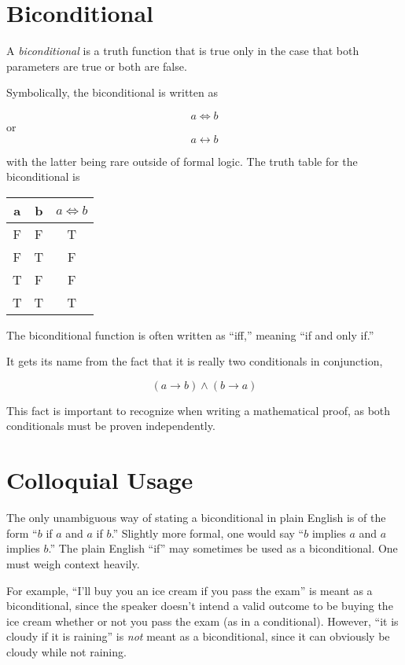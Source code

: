 \documentclass[12pt]{article}
\begin{document}
\section{Biconditional}

A \emph{biconditional} is a truth function that is true only in the case that both parameters are true or both are false.  

Symbolically, the biconditional is written as

$$ a \Leftrightarrow b$$
or 
$$ a \leftrightarrow b$$ 

with the latter being rare outside of formal logic.  The truth table for the biconditional is

\begin{center}
\begin{tabular}{ccc}
a & b & $a \Leftrightarrow b$ \\ 
\hline 
F & F & T \\
F & T & F \\
T & F & F \\ 
T & T & T 
\end{tabular}
\end{center}

The biconditional function is often written as ``iff,'' meaning ``if and only if.''  

It  gets its name from the fact that it is really two conditionals in conjunction, 

$$ (a \rightarrow b) \land (b \rightarrow a) $$

This fact is important to recognize when writing a mathematical proof, as both conditionals must be proven independently.

\section{Colloquial Usage}

The only unambiguous way of stating a biconditional in plain English is of the form ``$b$ if $a$ and $a$ if $b$.''  Slightly more formal, one would say ``$b$ implies $a$ and $a$ implies $b$.''  The plain English ``if'' may sometimes be used as a biconditional.  One must weigh context heavily.

For example, ``I'll buy you an ice cream if you pass the exam'' is meant as a biconditional, since the speaker doesn't intend a valid outcome to be buying the ice cream whether or not you pass the exam (as in a conditional).   However, ``it is cloudy if it is raining'' is \emph{not} meant as a biconditional, since it can obviously be cloudy while not raining.
\end{document}
